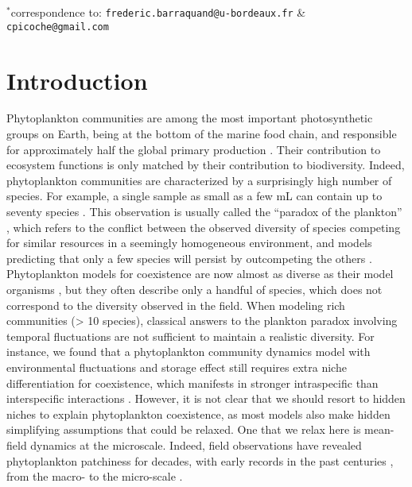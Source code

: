 \documentclass[12pt,english]{article}
\begin{document}
$^{*}$correspondence to: \verb|frederic.barraquand@u-bordeaux.fr|
\& \verb|cpicoche@gmail.com|

\clearpage{}

\section*{Introduction}

Phytoplankton communities are among the most important photosynthetic
groups on Earth, being at the bottom of the marine food chain, and
responsible for approximately half the global primary production \citep{field_primary_1998}.
Their contribution to ecosystem functions is only matched by their
contribution to biodiversity. Indeed, phytoplankton communities are
characterized by a surprisingly high number of species. For example,
a single sample as small as a few mL can contain up to seventy species
\citep{REPHY_db,widdicombe_2021}. This observation is usually called
the ``paradox of the plankton'' \citep[a term coined by][]{hutchinson_paradox_1961}, which refers to the conflict between the observed diversity of species competing for similar resources in a seemingly homogeneous environment, and models predicting that only a few species will persist by outcompeting the others \citep{macarthur_competition_1964,huisman_biodiversity_1999,schippers_does_2001}.
Phytoplankton models for coexistence are now almost as diverse as
their model organisms \citep{record_paradox_2014}, but they often
describe only a handful of species, which does not correspond to the
diversity observed in the field. When modeling rich communities (\textgreater{}
10 species), classical answers to the plankton paradox involving temporal
fluctuations \citep[e.g.,][]{li_effects_2016,chesson_updates_2018}
are not sufficient to maintain a realistic diversity. For instance,
we found that a phytoplankton community dynamics model with environmental
fluctuations and storage effect still requires extra niche differentiation
for coexistence, which manifests in stronger intraspecific than interspecific
interactions \citep{picoche_how_2019}. However, it is not clear that
we should resort to hidden niches to explain phytoplankton coexistence,
as most models also make hidden simplifying assumptions that could
be relaxed. One that we relax here is mean-field dynamics at the microscale.
Indeed, field observations have revealed phytoplankton patchiness
for decades, with early records in the past centuries \citep{bainbridge_size_1957,stocker_marine_2012},
from the macro- to the micro-scale \citep{leonard_interannual_2001,doubell_high-resolution_2006,font-munoz_advection_2017}.
\end{document}
